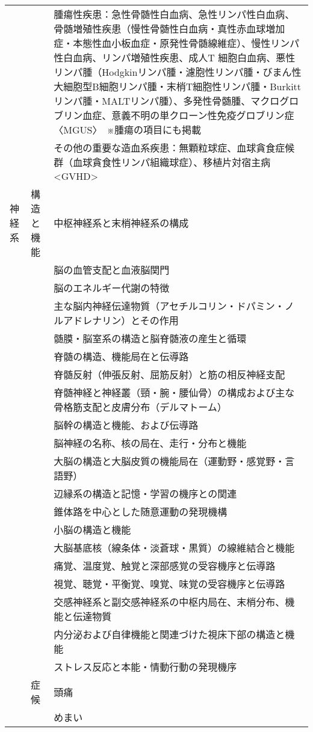 \documentclass[
]{ltjsarticle}
\begin{document}
\begin{xltabular}{\linewidth}{XXX}
 &  & 腫瘍性疾患：急性骨髄性白血病、急性リンパ性白血病、骨髄増殖性疾患（慢性骨髄性白血病・真性赤血球増加症・本態性血小板血症・原発性骨髄線維症）、慢性リンパ性白血病、リンパ増殖性疾患、成人T 細胞白血病、悪性リンパ腫（Hodgkinリンパ腫・濾胞性リンパ腫・びまん性大細胞型B細胞リンパ腫・末梢T細胞性リンパ腫・Burkittリンパ腫・MALTリンパ腫）、多発性骨髄腫、マクログロブリン血症、意義不明の単クローン性免疫グロブリン症〈MGUS〉　※腫瘍の項目にも掲載 \\
 &  & その他の重要な造血系疾患：無顆粒球症、血球貪食症候群（血球貪食性リンパ組織球症）、移植片対宿主病<GVHD> \\
神経系 & 構造と機能 & 中枢神経系と末梢神経系の構成 \\
 &  & 脳の血管支配と血液脳関門 \\
 &  & 脳のエネルギー代謝の特徴 \\
 &  & 主な脳内神経伝達物質（アセチルコリン・ドパミン・ノルアドレナリン）とその作用 \\
 &  & 髄膜・脳室系の構造と脳脊髄液の産生と循環 \\
 &  & 脊髄の構造、機能局在と伝導路 \\
 &  & 脊髄反射（伸張反射、屈筋反射）と筋の相反神経支配 \\
 &  & 脊髄神経と神経叢（頸・腕・腰仙骨）の構成および主な骨格筋支配と皮膚分布（デルマトーム） \\
 &  & 脳幹の構造と機能、および伝導路 \\
 &  & 脳神経の名称、核の局在、走行・分布と機能 \\
 &  & 大脳の構造と大脳皮質の機能局在（運動野・感覚野・言語野） \\
 &  & 辺縁系の構造と記憶・学習の機序との関連 \\
 &  & 錐体路を中心とした随意運動の発現機構 \\
 &  & 小脳の構造と機能 \\
 &  & 大脳基底核（線条体・淡蒼球・黒質）の線維結合と機能 \\
 &  & 痛覚、温度覚、触覚と深部感覚の受容機序と伝導路 \\
 &  & 視覚、聴覚・平衡覚、嗅覚、味覚の受容機序と伝導路 \\
 &  & 交感神経系と副交感神経系の中枢内局在、末梢分布、機能と伝達物質 \\
 &  & 内分泌および自律機能と関連づけた視床下部の構造と機能 \\
 &  & ストレス反応と本能・情動行動の発現機序 \\
 & 症候 & 頭痛 \\
 &  & めまい \\

\end{xltabular}
\end{document}
